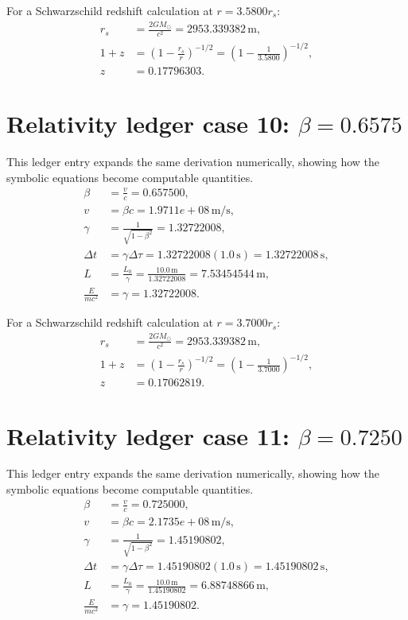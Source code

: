 \documentclass[11pt,a4paper]{article}
\begin{document}
For a Schwarzschild redshift calculation at $r=3.5800r_s$:
\begin{align}
r_s &= \frac{2GM_\odot}{c^2}=2953.339382\,\mathrm{m},\\
1+z &= \left(1-\frac{r_s}{r}\right)^{-1/2}
=\left(1-\frac{1}{3.5800}\right)^{-1/2},\\
z&=0.17796303.
\end{align}

\section{Relativity ledger case 10: $\beta=0.6575$}
This ledger entry expands the same derivation numerically, showing how the symbolic equations become computable quantities.
\begin{align}
\beta &= \frac{v}{c}=0.657500,\\
v &= \beta c = 1.9711e+08\,\mathrm{m/s},\\
\gamma &= \frac{1}{\sqrt{1-\beta^2}} = 1.32722008,\\
\Delta t &= \gamma\Delta\tau = 1.32722008(1.0\,\mathrm{s}) = 1.32722008\,\mathrm{s},\\
L &= \frac{L_0}{\gamma} = \frac{10.0\,\mathrm{m}}{1.32722008} = 7.53454544\,\mathrm{m},\\
\frac{E}{mc^2}&=\gamma=1.32722008.
\end{align}

For a Schwarzschild redshift calculation at $r=3.7000r_s$:
\begin{align}
r_s &= \frac{2GM_\odot}{c^2}=2953.339382\,\mathrm{m},\\
1+z &= \left(1-\frac{r_s}{r}\right)^{-1/2}
=\left(1-\frac{1}{3.7000}\right)^{-1/2},\\
z&=0.17062819.
\end{align}

\newpage

\section{Relativity ledger case 11: $\beta=0.7250$}
This ledger entry expands the same derivation numerically, showing how the symbolic equations become computable quantities.
\begin{align}
\beta &= \frac{v}{c}=0.725000,\\
v &= \beta c = 2.1735e+08\,\mathrm{m/s},\\
\gamma &= \frac{1}{\sqrt{1-\beta^2}} = 1.45190802,\\
\Delta t &= \gamma\Delta\tau = 1.45190802(1.0\,\mathrm{s}) = 1.45190802\,\mathrm{s},\\
L &= \frac{L_0}{\gamma} = \frac{10.0\,\mathrm{m}}{1.45190802} = 6.88748866\,\mathrm{m},\\
\frac{E}{mc^2}&=\gamma=1.45190802.
\end{align}
\end{document}
